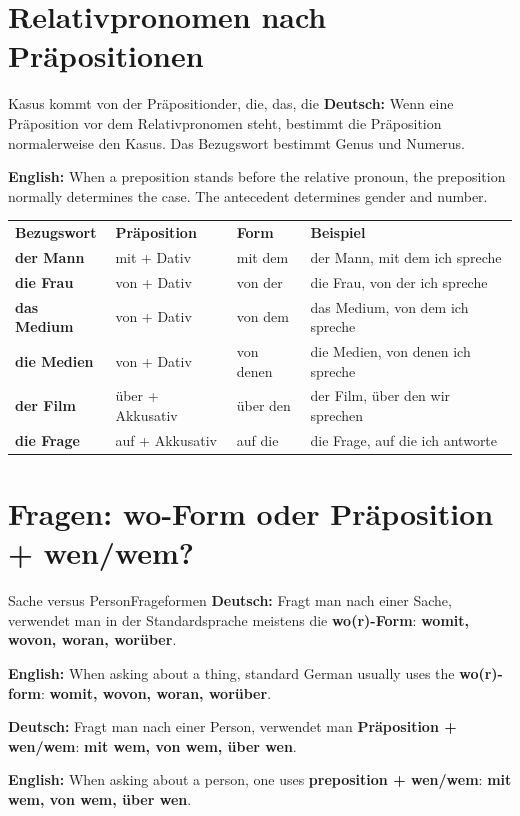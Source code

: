 \documentclass[a4paper,11pt]{article}
\newcommand{\GermanText}[1]{\textbf{Deutsch: }#1\par}
\newcommand{\EnglishText}[1]{{\small\color{SoftGray}\textbf{English: }#1\par}}
\begin{document}
    \section{Relativpronomen nach Präpositionen}

        \begin{grammarentry}{Kasus kommt von der Präposition}{der, die, das, die}
            \GermanText{Wenn eine Präposition vor dem Relativpronomen steht, bestimmt die Präposition normalerweise den Kasus. Das Bezugswort bestimmt Genus und Numerus.}
            \EnglishText{When a preposition stands before the relative pronoun, the preposition normally determines the case. The antecedent determines gender and number.}
        \end{grammarentry}

        \begin{longtable}{>{\bfseries}p{2.8cm}|p{2.8cm}|p{3.0cm}|p{5.3cm}}
            \rowcolor{HeaderBlueDark}
            \color{white}\textbf{Bezugswort} &
            \color{white}\textbf{Präposition} &
            \color{white}\textbf{Form} &
            \color{white}\textbf{Beispiel} \\
            der Mann & mit + Dativ & mit dem & der Mann, mit dem ich spreche \\
            die Frau & von + Dativ & von der & die Frau, von der ich spreche \\
            das Medium & von + Dativ & von dem & das Medium, von dem ich spreche \\
            die Medien & von + Dativ & von denen & die Medien, von denen ich spreche \\
            der Film & über + Akkusativ & über den & der Film, über den wir sprechen \\
            die Frage & auf + Akkusativ & auf die & die Frage, auf die ich antworte \\
        \end{longtable}

    \section{Fragen: wo-Form oder Präposition + wen/wem?}

        \begin{grammarentry}{Sache versus Person}{Frageformen}
            \GermanText{Fragt man nach einer Sache, verwendet man in der Standardsprache meistens die \textbf{wo(r)-Form}: \textbf{womit, wovon, woran, worüber}.}
            \EnglishText{When asking about a thing, standard German usually uses the \textbf{wo(r)-form}: \textbf{womit, wovon, woran, worüber}.}

            \GermanText{Fragt man nach einer Person, verwendet man \textbf{Präposition + wen/wem}: \textbf{mit wem, von wem, über wen}.}
            \EnglishText{When asking about a person, one uses \textbf{preposition + wen/wem}: \textbf{mit wem, von wem, über wen}.}
        \end{grammarentry}
\end{document}
